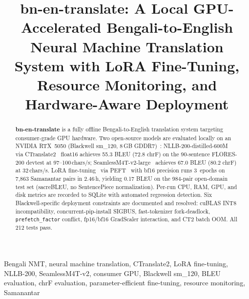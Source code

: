 \documentclass[conference]{IEEEtran}
\newcommand{\POSTFTBLEU}{0.17}
\newcommand{\TRAINDURATION}{2.46\,h}
\newcommand{\NLLBFLORESBLEU}{55.3}
\newcommand{\NLLBFLORESCHRF}{72.8}
\newcommand{\SEAMLESSPROJBLEU}{67.0}
\newcommand{\SEAMLESSPROJCHRF}{80.2}
\begin{document}

\title{bn-en-translate: A Local GPU-Accelerated Bengali-to-English Neural
Machine Translation System with LoRA Fine-Tuning, Resource Monitoring,
and Hardware-Aware Deployment}

\author{
}

\maketitle

\begin{abstract}
\textbf{bn-en-translate} is a fully offline Bengali-to-English translation system
targeting consumer-grade GPU hardware.
Two open-source models are evaluated locally on an NVIDIA RTX~5050 (Blackwell sm\_120,
8\,GB GDDR7)~\cite{nvidia_blackwell}: NLLB-200-distilled-600M~\cite{nllb2022} via
CTranslate2~\cite{ctranslate2_klein} float16 achieves \NLLBFLORESBLEU{} BLEU
(\NLLBFLORESCHRF{} chrF) on the 90-sentence FLORES-200 devtest at 97--100\,chars/s;
SeamlessM4T-v2-large~\cite{seamlessm4t2023} achieves \SEAMLESSPROJBLEU{} BLEU
(\SEAMLESSPROJCHRF{} chrF) at 32\,chars/s.
LoRA fine-tuning~\cite{hu2021lora} via PEFT~\cite{peft2022} with bf16 precision
runs 3~epochs on 7,863 Samanantar pairs in \TRAINDURATION, yielding \POSTFTBLEU{}
BLEU on the 984-pair open-domain test set (sacreBLEU, no SentencePiece normalization).
Per-run CPU, RAM, GPU, and disk metrics are recorded to SQLite with automated
regression detection.
Six Blackwell-specific deployment constraints are documented and resolved: cuBLAS
INT8 incompatibility, concurrent-pip-install SIGBUS, fast-tokenizer fork-deadlock,
\texttt{prefetch\_factor} conflict, fp16/bf16 GradScaler interaction, and CT2 batch OOM.
All 212 tests pass.
\end{abstract}

\begin{IEEEkeywords}
Bengali NMT, neural machine translation, CTranslate2, LoRA fine-tuning, NLLB-200,
SeamlessM4T-v2, consumer GPU, Blackwell sm\_120, BLEU evaluation, chrF evaluation,
parameter-efficient fine-tuning, resource monitoring, Samanantar
\end{IEEEkeywords}
\end{document}
